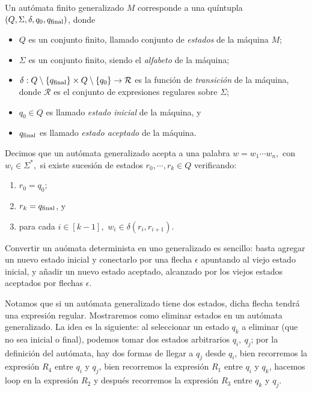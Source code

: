\begin{definicion}\label{CT1-D-GNFA}
    Un aut\'omata finito generalizado \(M\) corresponde a una qu\'intupla \((Q,\Sigma,\delta,q_0,q_{\rm final})\), donde
    \begin{itemize}
        \item \(Q\) es un conjunto finito, llamado conjunto de \emph{estados} de la m\'aquina \(M\);
        \item \(\Sigma\) es un conjunto finito, siendo el \emph{alfabeto} de la m\'aquina;
        \item \(\delta: Q \setminus \{q_{\rm final}\} \times Q \setminus \{q_0\} \to \mathcal{R} \) es la funci\'on de \emph{transici\'on} de la m\'aquina, donde \(\mathcal{R}\) es el conjunto de expresiones regulares sobre \(\Sigma\);
        \item \(q_0\in Q\) es llamado \emph{estado inicial} de la m\'aquina, y
        \item \(q_{\rm final}\) es llamado \emph{estado aceptado} de la m\'aquina.
    \end{itemize}
\end{definicion}

Decimos que un aut\'omata generalizado acepta a una palabra \(w=w_1\cdots w_n,\) con \(w_i\in\Sigma^*,\) si existe sucesi\'on de estados \(r_0,\cdots,r_k\in Q\) verificando:
\begin{enumerate}
    \item \(r_0=q_0;\)
    \item \(r_k=q_{\rm final}\), y
    \item para cada \(i\in [k-1],\) \(w_i\in \delta(r_{i},r_{i+1}).\) 
\end{enumerate}

Convertir un au\'omata determinista en uno generalizado es sencillo: basta agregar un nuevo estado inicial y conectarlo por una flecha \(\epsilon\) apuntando al viejo estado inicial, y a\~nadir un nuevo estado aceptado, alcanzado por los viejos estados aceptados por flechas \(\epsilon\).

Notamos que si un aut\'omata generalizado tiene dos estados, dicha flecha tendr\'a una expresi\'on regular. Mostraremos como eliminar estados en un aut\'omata generalizado.
La idea es la siguiente: al seleccionar un estado \(q_k\) a eliminar (que no sea inicial o final), podemos tomar dos estados arbitrarios \(q_i,\ q_j\); por la definici\'on del aut\'omata, hay dos formas de llegar a \(q_j\) desde \(q_i\), bien recorremos la expresi\'on \(R_4\) entre \(q_i\) y \(q_j\), bien recorremos la expresi\'on \(R_1\) entre \(q_i\) y \(q_k\), hacemos loop en la expresi\'on \(R_2\) y despu\'es recorremos la expresi\'on \(R_3\) entre \(q_k\) y \(q_j\). 

